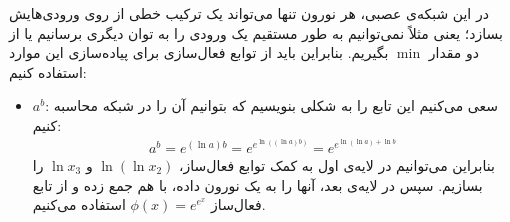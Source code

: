 \question{}

\begin{ابجد}
\item در این شبکه‌ی عصبی، هر نورون تنها می‌تواند یک ترکیب خطی از روی ورودی‌هایش بسازد؛ یعنی مثلاً نمی‌توانیم به طور مستقیم یک ورودی را به توان دیگری برسانیم یا از دو مقدار $\min$ بگیریم. بنابراین باید از توابع فعال‌سازی برای پیاده‌سازی این موارد استفاده کنیم:
\begin{itemize}
    \item $a^b$: سعی می‌کنیم این تابع را به شکلی بنویسیم که بتوانیم آن را در شبکه محاسبه کنیم:
          \begin{align*}
              a^b = e^{(\ln a)b} = e^{e^{\ln((\ln a)b)}} = e^{e^{\ln(\ln a) + \ln b}}
          \end{align*}
          بنابراین می‌توانیم در لایه‌ی اول به کمک توابع فعال‌ساز، $\ln (\ln x_2)$ و $\ln x_3$ را بسازیم. سپس در لایه‌ی بعد، آنها را به یک نورون داده، با هم جمع زده و از تابع فعال‌ساز $\phi(x) = e^{e^x}$ استفاده می‌کنیم.


\end{itemize}
\end{ابجد}
